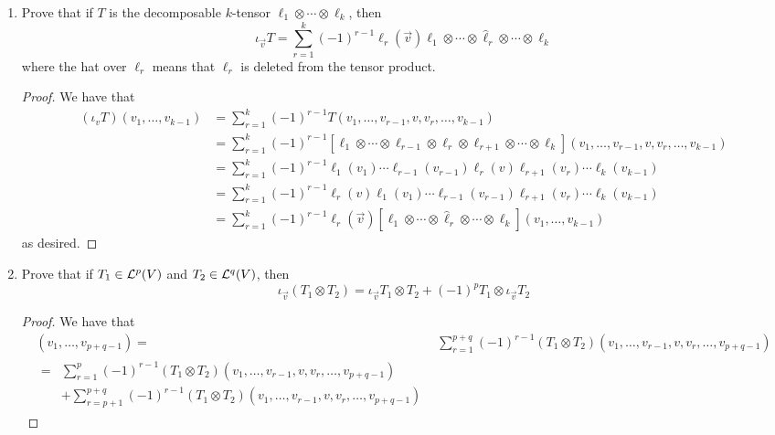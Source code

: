 \documentclass[../psets.tex]{subfiles}
\begin{document}
\begin{enumerate}[label={\textbf{1.7.\roman*.}}]
    \item Prove that if $T$ is the decomposable $k$-tensor $\ell_1\otimes\cdots\otimes\ell_k$, then
    \begin{equation*}
        \iota_\vec{v}T = \sum_{r=1}^k(-1)^{r-1}\ell_r(\vec{v})\ell_1\otimes\cdots\otimes\hat{\ell}_r\otimes\cdots\otimes\ell_k
    \end{equation*}
    where the hat over $\ell_r$ means that $\ell_r$ is deleted from the tensor product.
    \begin{proof}
        We have that
        \begin{align*}
            (\iota_vT)(v_1,\dots,v_{k-1}) &= \sum_{r=1}^k(-1)^{r-1}T(v_1,\dots,v_{r-1},v,v_r,\dots,v_{k-1})\\
            &= \sum_{r=1}^k(-1)^{r-1}[\ell_1\otimes\cdots\otimes\ell_{r-1}\otimes\ell_r\otimes\ell_{r+1}\otimes\cdots\otimes\ell_k](v_1,\dots,v_{r-1},v,v_r,\dots,v_{k-1})\\
            &= \sum_{r=1}^k(-1)^{r-1}\ell_1(v_1)\cdots\ell_{r-1}(v_{r-1})\ell_r(v)\ell_{r+1}(v_r)\cdots\ell_k(v_{k-1})\\
            &= \sum_{r=1}^k(-1)^{r-1}\ell_r(v)\ell_1(v_1)\cdots\ell_{r-1}(v_{r-1})\ell_{r+1}(v_r)\cdots\ell_k(v_{k-1})\\
            &= \sum_{r=1}^k(-1)^{r-1}\ell_r(\vec{v})[\ell_1\otimes\cdots\otimes\hat{\ell}_r\otimes\cdots\otimes\ell_k](v_1,\dots,v_{k-1})
        \end{align*}
        as desired.
    \end{proof}
    \item Prove that if $T_1\in\lin[p]{V}$ and $T_2\in\lin[q]{V}$, then
    \begin{equation*}
        \iota_\vec{v}(T_1\otimes T_2) = \iota_\vec{v}T_1\otimes T_2+(-1)^pT_1\otimes\iota_\vec{v}T_2
    \end{equation*}
    \begin{proof}
        We have that
        \begin{align*}
            [\iota_\vec{v}(T_1\otimes T_2)](v_1,\dots,v_{p+q-1}) ={}& \sum_{r=1}^{p+q}(-1)^{r-1}(T_1\otimes T_2)(v_1,\dots,v_{r-1},v,v_r,\dots,v_{p+q-1})\\
            \begin{split}
                ={}& \sum_{r=1}^p(-1)^{r-1}(T_1\otimes T_2)(v_1,\dots,v_{r-1},v,v_r,\dots,v_{p+q-1})\\
                &+\sum_{r=p+1}^{p+q}(-1)^{r-1}(T_1\otimes T_2)(v_1,\dots,v_{r-1},v,v_r,\dots,v_{p+q-1})

\end{split}
\end{align*}
\end{proof}
\end{enumerate}
\end{document}
